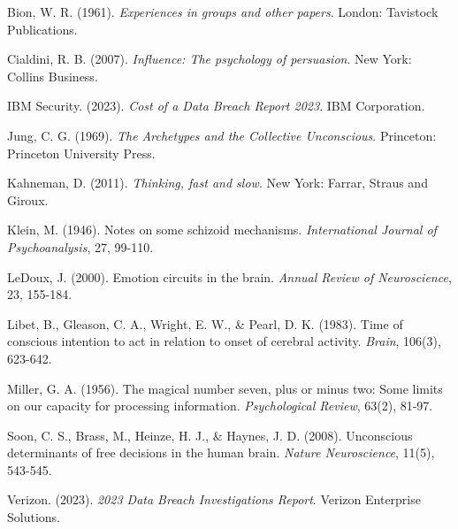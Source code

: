 \documentclass[10pt, twocolumn]{article}
\begin{document}
\begin{thebibliography}{99}

Bion, W. R. (1961). \textit{Experiences in groups and other papers}. London: Tavistock Publications.

Cialdini, R. B. (2007). \textit{Influence: The psychology of persuasion}. New York: Collins Business.

IBM Security. (2023). \textit{Cost of a Data Breach Report 2023}. IBM Corporation.

Jung, C. G. (1969). \textit{The Archetypes and the Collective Unconscious}. Princeton: Princeton University Press.

Kahneman, D. (2011). \textit{Thinking, fast and slow}. New York: Farrar, Straus and Giroux.

Klein, M. (1946). Notes on some schizoid mechanisms. \textit{International Journal of Psychoanalysis}, 27, 99-110.

LeDoux, J. (2000). Emotion circuits in the brain. \textit{Annual Review of Neuroscience}, 23, 155-184.

Libet, B., Gleason, C. A., Wright, E. W., \& Pearl, D. K. (1983). Time of conscious intention to act in relation to onset of cerebral activity. \textit{Brain}, 106(3), 623-642.

Miller, G. A. (1956). The magical number seven, plus or minus two: Some limits on our capacity for processing information. \textit{Psychological Review}, 63(2), 81-97.

Soon, C. S., Brass, M., Heinze, H. J., \& Haynes, J. D. (2008). Unconscious determinants of free decisions in the human brain. \textit{Nature Neuroscience}, 11(5), 543-545.

Verizon. (2023). \textit{2023 Data Breach Investigations Report}. Verizon Enterprise Solutions.

\end{thebibliography}
\end{document}
